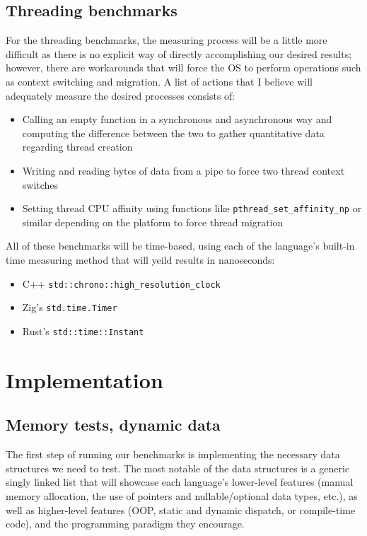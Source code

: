 \documentclass{article}
\begin{document}
\subsection{Threading benchmarks}
For the threading benchmarks, the measuring process will be a little more difficult as there is no explicit way of directly accomplishing our desired results; however, there are workarounds that will force the OS to perform operations such as context switching and migration. A list of actions that I believe will adequately measure the desired processes consists of:
\begin{itemize}
    \item Calling an empty function in a synchronous and asynchronous way and computing the difference between the two to gather quantitative data regarding thread creation
    \item Writing and reading bytes of data from a pipe to force two thread context switches
    \item Setting thread CPU affinity using functions like \texttt{pthread\_set\_affinity\_np} or similar depending on the platform to force thread migration
\end{itemize}

All of these benchmarks will be time-based, using each of the language's built-in time measuring method that will yeild results in nanoseconds:
\begin{itemize}
    \item C++ \texttt{std::chrono::high\_resolution\_clock}
    \item Zig's \texttt{std.time.Timer}
    \item Rust's \texttt{std::time::Instant}
\end{itemize}

\clearpage
\section{Implementation}
\subsection{Memory tests, dynamic data}
The first step of running our benchmarks is implementing the necessary data structures we need to test. The most notable of the data structures is a generic singly linked list that will showcase each language's lower-level features (manual memory allocation, the use of pointers and nullable/optional data types, etc.), as well as higher-level features (OOP, static and dynamic dispatch, or compile-time code), and the programming paradigm they encourage.
\end{document}

